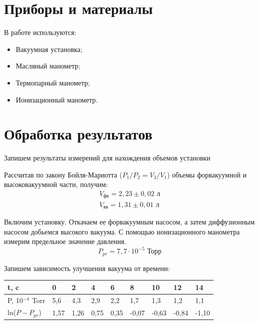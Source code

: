 \documentclass[12pt]{article}
\begin{document}
\section{Приборы и материалы}

В работе используются:

\begin{itemize}
	\item Вакуумная установка;
	\item Масляный манометр;
	\item Термопарный манометр;
	\item Ионизационный манометр.
\end{itemize}

\section{Обработка результатов}

Запишем результаты измерений для нахождения объемов установки


Рассчитав по закону Бойля-Мариотта ($P_1/P_2 = V_2/V_1$) объемы форвакуумной и высоковакуумной части, получим:
\begin{align*}
	V_\text{фв} = 2,23 \pm 0,02 \text{ л}\\
	V_\text{вв} = 1,31 \pm 0,01 \text{ л}
\end{align*}

Включим установку. Откачаем ее форвакуумным насосом, а затем диффузионным насосом добьемся высокого вакуума. С помощью ионизационного манометра измерим предельное значение давления.
\[
	P_{pr} = 7,7 \cdot 10^{-5} \text{ Торр}
\]

Запишем зависимость улучшения вакуума от времени:
\begin{table}[H]
	\centering
	\begin{tabular}{|l|l|l|l|l|l|l|l|l|}
		\hline
		t, c              & 0    & 2    & 4    & 6    & 8     & 10    & 12    & 14    \\ \hline
		P, 10$^{-4}$ Torr & 5,6  & 4,3  & 2,9  & 2,2  & 1,7   & 1,3   & 1,2   & 1,1   \\ \hline
		ln($P-P_{pr}$)    & 1,57 & 1,26 & 0,75 & 0,35 & -0,07 & -0,63 & -0,84 & -1,10 \\ \hline
	\end{tabular}
\end{table}
\end{document}
